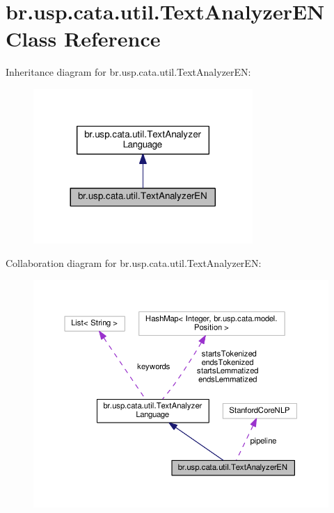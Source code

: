 \hypertarget{classbr_1_1usp_1_1cata_1_1util_1_1_text_analyzer_e_n}{\section{br.\+usp.\+cata.\+util.\+Text\+Analyzer\+E\+N Class Reference}
\label{classbr_1_1usp_1_1cata_1_1util_1_1_text_analyzer_e_n}
}


Inheritance diagram for br.\+usp.\+cata.\+util.\+Text\+Analyzer\+E\+N\+:\nopagebreak
\begin{figure}[H]
\begin{center}
\leavevmode
\includegraphics[width=236pt]{classbr_1_1usp_1_1cata_1_1util_1_1_text_analyzer_e_n__inherit__graph}
\end{center}
\end{figure}


Collaboration diagram for br.\+usp.\+cata.\+util.\+Text\+Analyzer\+E\+N\+:\nopagebreak
\begin{figure}[H]
\begin{center}
\leavevmode
\includegraphics[width=350pt]{classbr_1_1usp_1_1cata_1_1util_1_1_text_analyzer_e_n__coll__graph}
\end{center}
\end{figure}
